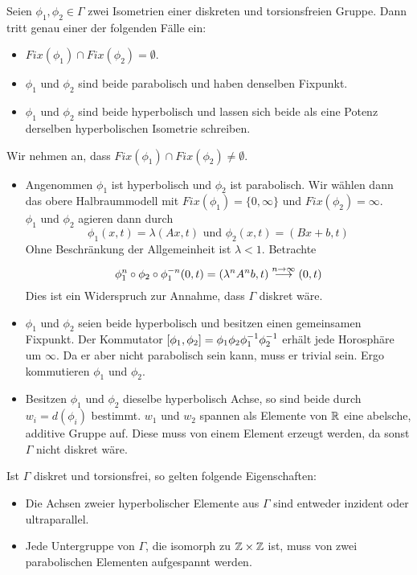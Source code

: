 \documentclass{book}
\begin{document}
\Lem{}
\label{Lemma 422}
Seien $\phi_1, \phi_2 \in \Gamma$ zwei Isometrien einer diskreten und torsionsfreien Gruppe. Dann tritt genau einer der folgenden Fälle ein:
\begin{itemize}
	\item $Fix(\phi_1) \cap Fix(\phi_2) = \emptyset$.
	\item $\phi_1$ und $\phi_2$ sind beide parabolisch und haben denselben Fixpunkt.
	\item $\phi_1$ und $\phi_2$ sind beide hyperbolisch und lassen sich beide als eine Potenz derselben hyperbolischen Isometrie schreiben.
\end{itemize}
\begin{Beweis}{}
	Wir nehmen an, dass $Fix(\phi_1) \cap Fix(\phi_2) \neq \emptyset$.
\begin{itemize}
	\item Angenommen $\phi_1$ ist hyperbolisch und $\phi_2$ ist parabolisch. Wir wählen dann das obere Halbraummodell mit $Fix(\phi_1) = \{0, \infty\}$ und $Fix(\phi_2) = \infty$.\\
	$\phi_1$ und $\phi_2$ agieren dann durch
	\[ \phi_1(x,t) = \lambda(Ax, t) \text{ und } \phi_2(x,t) = (Bx + b, t) \]
	Ohne Beschränkung der Allgemeinheit ist $\lambda < 1$. Betrachte
	\[ \phi_1^n\circ \phi_2 \circ \phi_1^{-n}(0,t) = (\lambda^n A^nb, t) \overset{n \overset{}{\rightarrow} \infty}{\longrightarrow} (0,t) \]
	Dies ist ein Widerspruch zur Annahme, dass $\Gamma$ diskret wäre.
	\item $\phi_1$ und $\phi_2$ seien beide hyperbolisch und besitzen einen gemeinsamen Fixpunkt. Der Kommutator $[\phi_1, \phi_2] = \phi_1\phi_2 \phi_1^{-1} \phi_2^{-1}$ erhält jede Horosphäre um $\infty$. Da er aber nicht parabolisch sein kann, muss er trivial sein. Ergo kommutieren $\phi_1$ und $\phi_2$.
	\item Besitzen $\phi_1$ und $\phi_2$ dieselbe hyperbolisch Achse, so sind beide durch $w_i = d(\phi_i)$ bestimmt. $w_1$ und $w_2$ spannen als Elemente von $\mathbb{R}$ eine abelsche, additive Gruppe auf. Diese muss von einem Element erzeugt werden, da sonst $\Gamma$ nicht diskret wäre.
\end{itemize}
\end{Beweis}

\Kor{}
Ist $\Gamma$ diskret und torsionsfrei, so gelten folgende Eigenschaften:
\begin{itemize}
	\item Die Achsen zweier hyperbolischer Elemente aus $\Gamma$ sind entweder inzident oder ultraparallel.
	\item Jede Untergruppe von $\Gamma$, die isomorph zu $\mathbb{Z}\times \mathbb{Z}$ ist, muss von zwei parabolischen Elementen aufgespannt werden.
\end{itemize}
\end{document}
